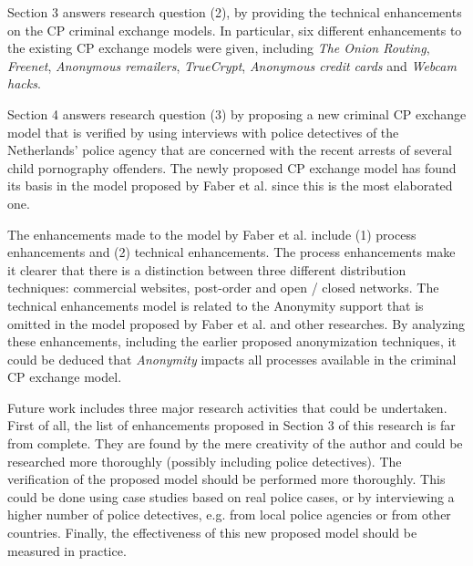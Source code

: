 \documentclass{sig-alternate-br}
\begin{document}
Section 3 answers research question (2), by providing the technical enhancements on the CP criminal exchange models. In particular, six different enhancements to the existing CP exchange models were given, including \textit{The Onion Routing}, \textit{Freenet}, \textit{Anonymous remailers}, \textit{TrueCrypt}, \textit{Anonymous credit cards} and \textit{Webcam hacks}.

Section 4 answers research question (3) by proposing a new criminal CP exchange model that is verified by using interviews with police detectives of the Netherlands' police agency that are concerned with the recent arrests of several child pornography offenders. The newly proposed CP exchange model has found its basis in the model proposed by Faber et al. \cite{en2011phishing} since this is the most elaborated one. 

The enhancements made to the model by Faber et al. include (1) process enhancements and (2) technical enhancements. The process enhancements make it clearer that there is a distinction between three different distribution techniques: commercial websites, post-order and open / closed networks. The technical enhancements model is related to the Anonymity support that is omitted in the model proposed by Faber et al. \cite{en2011phishing} and other researches. By analyzing these enhancements, including  the earlier proposed anonymization techniques, it could be deduced that \textit{Anonymity} impacts all processes available in the criminal CP exchange model.

Future work includes three major research activities that could be undertaken. First of all, the list of enhancements proposed in Section 3 of this research is far from complete. They are found by the mere creativity of the author and could be researched more thoroughly (possibly including police detectives). The verification of the proposed model should be performed more thoroughly. This could be done using case studies based on real police cases, or by interviewing a higher number of police detectives, e.g. from local police agencies or from other countries.
Finally, the effectiveness of this new proposed model should be measured in practice.



\vspace{50 mm}


\balancecolumns
\end{document}
